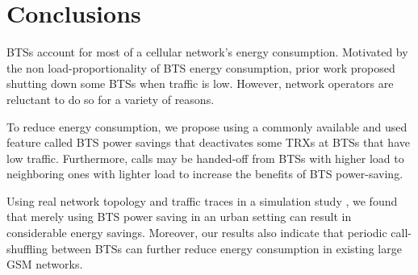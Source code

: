 \section{Conclusions}
\label{sec:conclusions}
BTSs account for most of a cellular network's energy consumption. Motivated by the non load-proportionality of BTS energy consumption, prior work proposed shutting down some BTSs when traffic is low. However, network operators are reluctant to do so for a variety of reasons.

To reduce energy consumption, we propose using a commonly available and used feature called BTS power savings that deactivates some TRXs at BTSs that have low traffic. Furthermore, calls may be handed-off from BTSs with higher load to neighboring ones with lighter load to increase the benefits of BTS power-saving.

Using real network topology and traffic traces in a simulation study , we found that merely using BTS power saving in an urban setting can result in considerable energy savings. Moreover, our results also indicate that periodic call-shuffling between BTSs can further reduce energy consumption in existing large GSM networks.